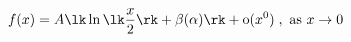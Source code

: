\begin{equation}
\label{G10}
f(x) = A \lk \ln \lk \frac{x}{2} \rk + \beta(\alpha)\rk
+ \text{o}(x^0)\;, \text{ as } x \rightarrow 0
\end{equation}


